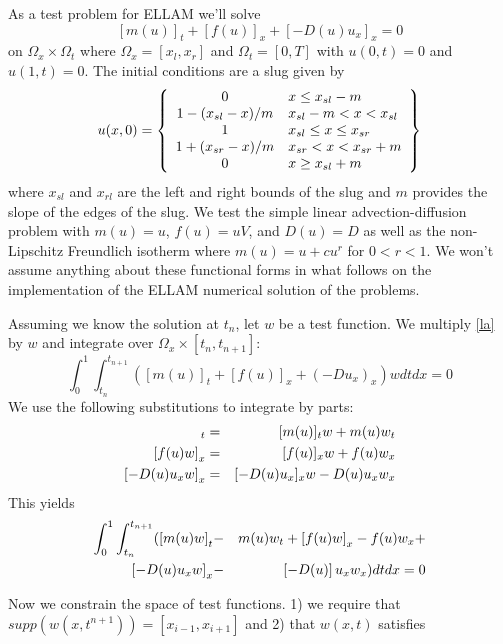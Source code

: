 \documentclass[10pt,dvips,twoside,reqno]{amsart}
\begin{document}
As a test problem for ELLAM we'll solve
\begin{equation}
\label{la}
[m(u)]_t + [f(u)]_x + [-D(u) u_x]_x = 0
\end{equation}
on $\Omega_x \times \Omega_t$ where $\Omega_x=[x_l,x_r]$ and $\Omega_t=[0,T]$ with $u(0,t)=0$ and $u(1,t)=0$. The initial conditions are a slug given by
\begin{equation}
u(x,0) = \left\{ \begin{array}{cl} 
0 & x \leq x_{sl} - m\\
1 - (x_{sl} - x)/m & x_{sl} - m < x < x_{sl} \\
1 & x_{sl} \leq x \leq x_{sr} \\ 
1 + (x_{sr} - x)/m & x_{sr} < x < x_{sr} + m  \\
0 & x \geq x_{sl} + m
\end{array} 
\right\} \end{equation} 
where $x_{sl}$ and $x_{rl}$ are the left and right bounds of the slug
and $m$ provides the slope of the edges of the slug. We test the
simple linear advection-diffusion problem with $m(u)=u$, $f(u)=uV$,
and $D(u)=D$ as well as the non-Lipschitz Freundlich isotherm where
$m(u) = u + c u^r$ for $0<r<1$. We won't assume anything about these
functional forms in what follows on the implementation of the ELLAM
numerical solution of the problems.

Assuming we know the solution at $t_n$, let $w$ be a test function. We
multiply \ref{la} by $w$ and integrate over $\Omega_x \times
[t_n,t_{n+1}]$: 
\begin{equation} 
\int_0^1 \int_{t_n}^{t_{n+1}} ([m(u)]_t +
[f(u)]_x + (-Du_x)_x)w dt dx =0 
\end{equation} 
We use the following substitutions to integrate by parts: 
\begin{eqnarray}
[m(u)w]_t &=& [m(u)]_t w + m(u) w_t \\
\sbl f(u)w \sbr_x &=& [f(u)]_x w + f(u) w_x \\
\sbl -D(u) u_x w \sbr_x &=& [-D(u) u_x]_x w - D(u) u_x w_x 
\end{eqnarray} 
This yields 
\begin{eqnarray} 
\int_0^1 \int_{t_n}^{t_{n+1}} (\left[ m(u)w \right]_t &-& m(u) w_t
+ \left[ f(u) w \right]_x - f(u) w_x + \\
\left[ -D(u) u_x w \right]_x &-& \left[ -D(u) \right]
u_x w_x )dt dx =0 
\end{eqnarray} 

Now we constrain the space of test functions.  1) we require that \linebreak
$supp(w(x,t^{n+1}))=[x_{i-1},x_{i+1}]$ and 2) that $w(x,t)$ satisfies
\end{document}
